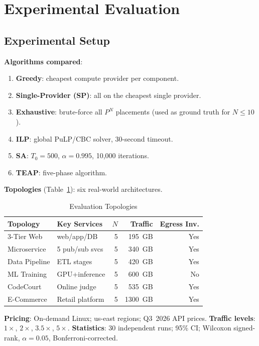 \documentclass[10pt,journal]{IEEEtran}
\begin{document}
\section{Experimental Evaluation}\label{sec:eval}

\subsection{Experimental Setup}

\textbf{Algorithms compared}:
\begin{enumerate}[leftmargin=*,noitemsep]
  \item \textbf{Greedy}: cheapest compute provider per component.
  \item \textbf{Single-Provider (SP)}: all on the cheapest single provider.
  \item \textbf{Exhaustive}: brute-force all $P^N$ placements (used as ground truth for $N\leq10$).
  \item \textbf{ILP}: global PuLP/CBC solver, 30-second timeout.
  \item \textbf{SA}: $T_0=500$, $\alpha=0.995$, 10{,}000 iterations.
  \item \textbf{TEAP}: five-phase algorithm.
\end{enumerate}

\textbf{Topologies} (Table~\ref{tab:topologies}): six real-world architectures.

\begin{table}[ht]
\centering
\caption{Evaluation Topologies}
\label{tab:topologies}
\setlength{\tabcolsep}{4pt}
\begin{tabular}{llrrr}
\toprule
Topology & Key Services & $N$ & Traffic & Egress Inv.\\
\midrule
3-Tier Web    & web/app/DB      & 5 & 195~GB & Yes\\
Microservice  & 5 pub/sub svcs  & 5 & 340~GB & Yes\\
Data Pipeline & ETL stages      & 5 & 420~GB & Yes\\
ML Training   & GPU+inference   & 5 & 600~GB & No\\
CodeCourt     & Online judge    & 5 & 535~GB & Yes\\
E-Commerce    & Retail platform & 5 & 1300~GB& Yes\\
\bottomrule
\end{tabular}
\end{table}

\textbf{Pricing}: On-demand Linux; us-east regions; Q3~2026 API prices.
\textbf{Traffic levels}: $1\times$, $2\times$, $3.5\times$, $5\times$.
\textbf{Statistics}: 30 independent runs; 95\% CI; Wilcoxon signed-rank, $\alpha = 0.05$, Bonferroni-corrected.
\end{document}
